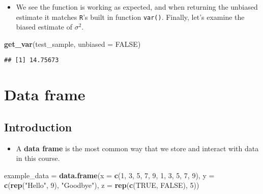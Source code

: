 \documentclass[]{book}
\newenvironment{Shaded}{\begin{snugshade}}{\end{snugshade}}
\newcommand{\KeywordTok}[1]{\textcolor[rgb]{0.13,0.29,0.53}{\textbf{#1}}}
\newcommand{\DataTypeTok}[1]{\textcolor[rgb]{0.13,0.29,0.53}{#1}}
\newcommand{\DecValTok}[1]{\textcolor[rgb]{0.00,0.00,0.81}{#1}}
\newcommand{\StringTok}[1]{\textcolor[rgb]{0.31,0.60,0.02}{#1}}
\newcommand{\OtherTok}[1]{\textcolor[rgb]{0.56,0.35,0.01}{#1}}
\newcommand{\NormalTok}[1]{#1}
\providecommand{\tightlist}{%
  \setlength{\itemsep}{0pt}\setlength{\parskip}{0pt}}
\begin{document}
\begin{itemize}
\tightlist
\item
  We see the function is working as expected, and when returning the
  unbiased estimate it matches \texttt{R}'s built in function
  \texttt{var()}. Finally, let's examine the biased estimate of
  \(\sigma^2\).
\end{itemize}

\begin{Shaded}
\begin{Highlighting}[]
\KeywordTok{get_var}\NormalTok{(test_sample, }\DataTypeTok{unbiased =} \OtherTok{FALSE}\NormalTok{)}
\end{Highlighting}
\end{Shaded}

\begin{verbatim}
## [1] 14.75673
\end{verbatim}

\chapter{Data frame}\label{data-frame}

\section{Introduction}\label{introduction}

\begin{itemize}
\tightlist
\item
  A \textbf{data frame} is the most common way that we store and
  interact with data in this course.
\end{itemize}

\begin{Shaded}
\begin{Highlighting}[]
\NormalTok{example_data =}\StringTok{ }\KeywordTok{data.frame}\NormalTok{(}\DataTypeTok{x =} \KeywordTok{c}\NormalTok{(}\DecValTok{1}\NormalTok{, }\DecValTok{3}\NormalTok{, }\DecValTok{5}\NormalTok{, }\DecValTok{7}\NormalTok{, }\DecValTok{9}\NormalTok{, }\DecValTok{1}\NormalTok{, }\DecValTok{3}\NormalTok{, }\DecValTok{5}\NormalTok{, }\DecValTok{7}\NormalTok{, }\DecValTok{9}\NormalTok{),}
                          \DataTypeTok{y =} \KeywordTok{c}\NormalTok{(}\KeywordTok{rep}\NormalTok{(}\StringTok{"Hello"}\NormalTok{, }\DecValTok{9}\NormalTok{), }\StringTok{"Goodbye"}\NormalTok{),}
                          \DataTypeTok{z =} \KeywordTok{rep}\NormalTok{(}\KeywordTok{c}\NormalTok{(}\OtherTok{TRUE}\NormalTok{, }\OtherTok{FALSE}\NormalTok{), }\DecValTok{5}\NormalTok{))}
\end{Highlighting}
\end{Shaded}
\end{document}
